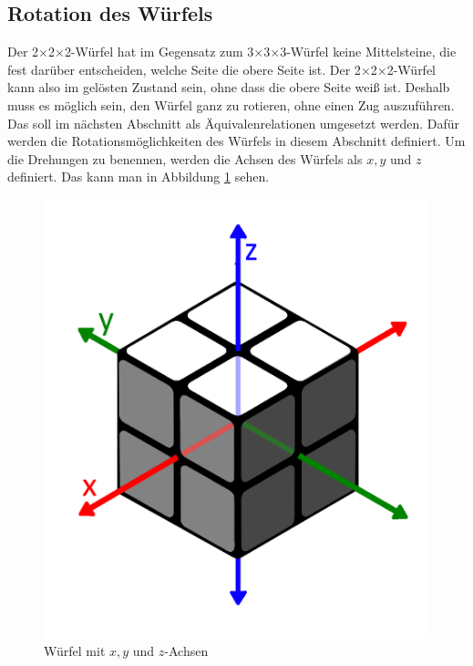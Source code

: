 \documentclass[12pt,a4paper, usenames, dvipsnames]{article}
\theoremstyle{mystyle}
\theoremstyle{definition}
\newcommand{\Ttwo}{2$\times$2$\times$2-}
\newcommand{\Tthree}{3$\times$3$\times$3-}
\begin{document}
%
%
%
%
%
%
%
%
%
%
%
%
\subsection*{Rotation des Würfels}

Der \Ttwo Würfel hat im Gegensatz zum \Tthree Würfel keine Mittelsteine, die fest darüber entscheiden, welche Seite die obere Seite ist. 
Der \Ttwo Würfel kann also im gelösten Zustand sein, ohne dass die obere Seite weiß ist. Deshalb muss es möglich sein, den Würfel ganz zu rotieren, ohne einen Zug auszuführen.
Das soll im nächsten Abschnitt als Äquivalenrelationen umgesetzt werden. Dafür werden die Rotationsmöglichkeiten des Würfels in diesem Abschnitt definiert.
Um die Drehungen zu benennen, werden die Achsen des Würfels als $x, y$ und $z$ definiert. Das kann man in Abbildung \ref{15} sehen.
\begin{figure}[h]
\centering
\includegraphics[scale=0.13]{Pfeile.png}
\caption[Würfel mit $x, y$ und $z$-Achsen]{Würfel mit $x, y$ und $z$-Achsen}
\label{15}
\end{figure} 
\end{document}

